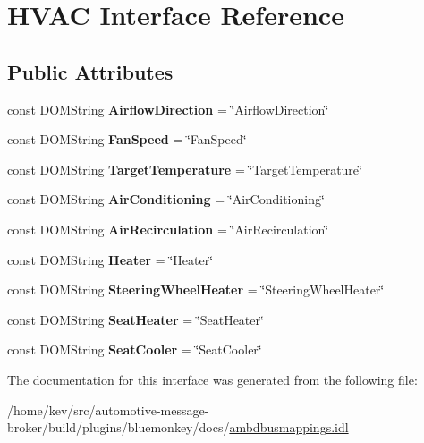 \hypertarget{interfaceHVAC}{\section{H\+V\+A\+C Interface Reference}
\label{interfaceHVAC}
}
\subsection*{Public Attributes}
\begin{DoxyCompactItemize}
\item 
\hypertarget{interfaceHVAC_a9c9da298987d1f7947e78bb494a5393a}{const D\+O\+M\+String {\bfseries Airflow\+Direction} = \char`\"{}Airflow\+Direction\char`\"{}}\label{interfaceHVAC_a9c9da298987d1f7947e78bb494a5393a}

\item 
\hypertarget{interfaceHVAC_a58d0a4238baeec3d60616dce4f740a5d}{const D\+O\+M\+String {\bfseries Fan\+Speed} = \char`\"{}Fan\+Speed\char`\"{}}\label{interfaceHVAC_a58d0a4238baeec3d60616dce4f740a5d}

\item 
\hypertarget{interfaceHVAC_a822cb43250a25fecaca0721ac316ff6c}{const D\+O\+M\+String {\bfseries Target\+Temperature} = \char`\"{}Target\+Temperature\char`\"{}}\label{interfaceHVAC_a822cb43250a25fecaca0721ac316ff6c}

\item 
\hypertarget{interfaceHVAC_afda1098bcd46867aff6f8d01ccad7927}{const D\+O\+M\+String {\bfseries Air\+Conditioning} = \char`\"{}Air\+Conditioning\char`\"{}}\label{interfaceHVAC_afda1098bcd46867aff6f8d01ccad7927}

\item 
\hypertarget{interfaceHVAC_a2af8221124a3103ed8e650291201b439}{const D\+O\+M\+String {\bfseries Air\+Recirculation} = \char`\"{}Air\+Recirculation\char`\"{}}\label{interfaceHVAC_a2af8221124a3103ed8e650291201b439}

\item 
\hypertarget{interfaceHVAC_a1ae099558e45de814f7f98ca40569d20}{const D\+O\+M\+String {\bfseries Heater} = \char`\"{}Heater\char`\"{}}\label{interfaceHVAC_a1ae099558e45de814f7f98ca40569d20}

\item 
\hypertarget{interfaceHVAC_a9ded4ce0a6395a07d6610d578a733f54}{const D\+O\+M\+String {\bfseries Steering\+Wheel\+Heater} = \char`\"{}Steering\+Wheel\+Heater\char`\"{}}\label{interfaceHVAC_a9ded4ce0a6395a07d6610d578a733f54}

\item 
\hypertarget{interfaceHVAC_abcef6ca51ca4070a85169f2ec27482b5}{const D\+O\+M\+String {\bfseries Seat\+Heater} = \char`\"{}Seat\+Heater\char`\"{}}\label{interfaceHVAC_abcef6ca51ca4070a85169f2ec27482b5}

\item 
\hypertarget{interfaceHVAC_a88527992264def26ff4df3e415ad3579}{const D\+O\+M\+String {\bfseries Seat\+Cooler} = \char`\"{}Seat\+Cooler\char`\"{}}\label{interfaceHVAC_a88527992264def26ff4df3e415ad3579}

\end{DoxyCompactItemize}


The documentation for this interface was generated from the following file\+:\begin{DoxyCompactItemize}
\item 
/home/kev/src/automotive-\/message-\/broker/build/plugins/bluemonkey/docs/\hyperlink{ambdbusmappings_8idl}{ambdbusmappings.\+idl}\end{DoxyCompactItemize}
